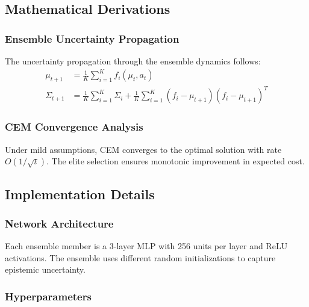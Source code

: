 \documentclass[10pt,twocolumn,letterpaper]{article}
\begin{document}
\subsection{Mathematical Derivations}

\subsubsection{Ensemble Uncertainty Propagation}

The uncertainty propagation through the ensemble dynamics follows:
\begin{align}
\mu_{t+1} &= \frac{1}{K} \sum_{i=1}^K f_i(\mu_t, a_t) \\
\Sigma_{t+1} &= \frac{1}{K} \sum_{i=1}^K \Sigma_i + \frac{1}{K} \sum_{i=1}^K (f_i - \mu_{t+1})(f_i - \mu_{t+1})^T
\end{align}

\subsubsection{CEM Convergence Analysis}

Under mild assumptions, CEM converges to the optimal solution with rate $O(1/\sqrt{t})$. The elite selection ensures monotonic improvement in expected cost.

\subsection{Implementation Details}

\subsubsection{Network Architecture}

Each ensemble member is a 3-layer MLP with 256 units per layer and ReLU activations. The ensemble uses different random initializations to capture epistemic uncertainty.

\subsubsection{Hyperparameters}
\end{document}
